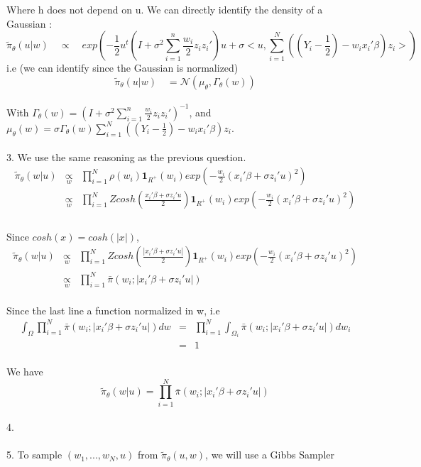 Where h does not depend on u. We can directly identify the density of a Gaussian :
$$ \tilde{\pi}_{\theta}(u | w) \quad \propto \quad exp(-\frac{1}{2}u^t (I+\sigma^{2}\sum_{i=1}^{n}\frac{ w_i}{2}z_i z_i')u + \sigma<u, \sum_{i=1}^{N}((Y_i-\frac{1}{2})- w_{i}x_i'\beta)z_i>)$$
i.e (we can identify since the Gaussian is normalized)
$$ \boxed{\tilde{\pi}_{\theta}(u | w) \quad = \mathcal{N}(\mu_{\theta},\Gamma_{\theta}(w))}$$
~\\
With $\boxed{\Gamma_{\theta}(w)=(I+\sigma^{2}\sum_{i=1}^{n}\frac{ w_i}{2}z_i z_i')^{-1}}$, and $\boxed{\mu_{\theta}(w)=\sigma \Gamma_{\theta}(w)\sum_{i=1}^{N}((Y_i-\frac{1}{2})-w_ix_i'\beta)z_i}$.~\\
~\\
3. We use the same reasoning as the previous question. 
\begin{eqnarray*}
	\tilde{\pi}_{\theta}(w | u) & \underset{w}\propto & \prod_{i=1}^{N}\rho(w_i)\textbf{1}_{R^{+}}(w_i)exp(-\frac{w_i}{2}(x_i'\beta+\sigma z_i'u)^2) \\
	& \underset{w}\propto & \prod_{i=1}^{N}Zcosh(\frac{x_i'\beta + \sigma z_i'u}{2})\textbf{1}_{R^{+}}(w_i)exp(-\frac{w_i}{2}(x_i'\beta+\sigma z_i'u)^2)\\
\end{eqnarray*}~\\
Since $cosh(x)=cosh(|x|)$,
\begin{eqnarray*}
	\tilde{\pi}_{\theta}(w | u)
	& \underset{w}\propto & \prod_{i=1}^{N}Zcosh(\frac{|x_i'\beta + \sigma z_i'u|}{2})\textbf{1}_{R^{+}}(w_i)exp(-\frac{w_i}{2}(x_i'\beta+\sigma z_i'u)^2)\\
	& \underset{w}\propto & \prod_{i=1}^{N}\bar{\pi}(w_i ;|x_i'\beta + \sigma z_i' u|)
\end{eqnarray*}~\\
Since the last line a function normalized in w, i.e
\begin{eqnarray*}
	\int_{\Omega}\prod_{i=1}^{N}\bar{\pi}(w_i ;|x_i'\beta + \sigma z_i' u|)dw &=& \prod_{i=1}^{N} \int_{\Omega_i}\bar{\pi}(w_i ;|x_i'\beta + \sigma z_i' u|)dw_i\\
	&=& 1
\end{eqnarray*}~\\    	
We have 
$$\boxed{\tilde{\pi}_{\theta}(w | u)= \prod_{i=1}^{N}\bar{\pi}(w_i ;|x_i'\beta + \sigma z_i' u|)}$$
~\\
4.~\\
~\\
5. To sample $(w_{1},...,w_{N},u)$ from $\tilde{\pi}_{\theta}(u,w)$, we will use a Gibbs Sampler 	

